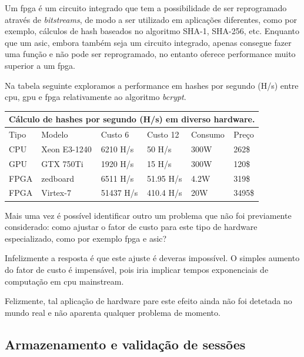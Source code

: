 Um \gls{fpga} é um circuito integrado que tem a possibilidade de ser reprogramado através de \emph{bitstreams}, de modo a ser utilizado em aplicações diferentes, como por exemplo, cálculos de hash baseados no algoritmo SHA-1, SHA-256, etc. Enquanto que um \gls{asic}, embora também seja um circuito integrado, apenas consegue fazer uma função e não pode ser reprogramado, no entanto oferece performance muito superior a um \gls{fpga}.

Na tabela seguinte exploramos a performance em hashes por segundo (H/s) entre \gls{cpu}, \gls{gpu} e \gls{fpga} relativamente ao algoritmo \emph{bcrypt}.

\begin{center}
    \begin{tabular}{ |p{1cm}|p{2.5cm}|p{2cm}|p{2cm}|p{1.75cm}|p{0.9cm}|  }
        \hline
        \multicolumn{6}{|c|}{Cálculo de hashes por segundo (H/s) em diverso hardware.} \\
        \hline
        Tipo & Modelo & Custo 6 & Custo 12 & Consumo & Preço\\
        \hline
        CPU & Xeon E3-1240 & 6210 H/s & 50 H/s& 300W & 262\$\\
        GPU & GTX 750Ti & 1920 H/s& 15 H/s& 300W & 120\$\\
        FPGA & zedboard & 6511 H/s & 51.95 H/s& 4.2W & 319\$\\
        FPGA & Virtex-7 & 51437 H/s& 410.4 H/s& 20W & 3495\$\\
        \hline
    \end{tabular}
\label{tab:bcrypt_hashrate} 
\end{center}

Mais uma vez é possível identificar outro um problema que não foi previamente considerado: como ajustar o fator de custo para este tipo de hardware especializado, como por exemplo \gls{fpga} e \gls{asic}?

Infelizmente a resposta é que este ajuste é deveras impossível. O simples aumento do fator de custo é impensável, pois iria implicar tempos exponenciais de computação em \gls{cpu} mainstream.

Felizmente, tal aplicação de hardware pare este efeito ainda não foi detetada no mundo real e não aparenta qualquer problema de momento.

\cleardoublepage
\subsection{Armazenamento e validação de sessões}

